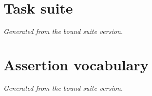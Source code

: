 \section{Task suite}
\label{app:tasks}


\emph{Generated from the bound suite version.}

\section{Assertion vocabulary}
\label{app:vocab}


\emph{Generated from the bound suite version.}

